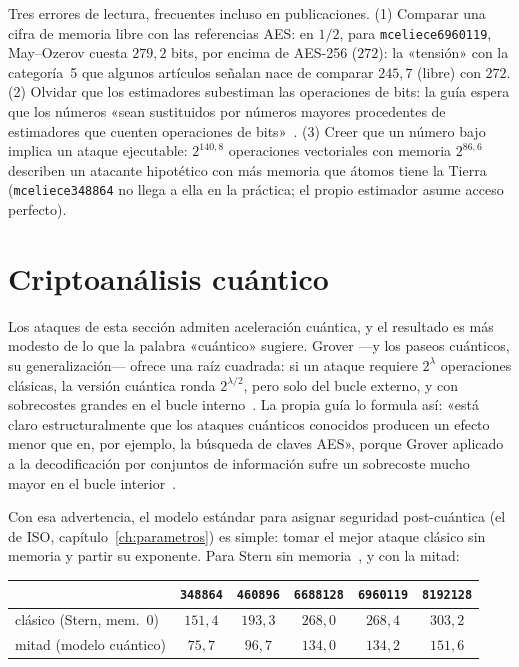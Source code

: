 \begin{trampa}
Tres errores de lectura, frecuentes incluso en publicaciones. (1)
Comparar una cifra de memoria libre con las referencias AES: en
$1/2$, para \texttt{mceliece6960119}, May--Ozerov cuesta $279{,}2$
bits, por encima de AES-256 ($272$): la «tensión» con la categoría~5
que algunos artículos señalan nace de comparar $245{,}7$ (libre) con
$272$. (2) Olvidar que los estimadores subestiman las operaciones de
bits: la guía espera que los números «sean sustituidos por números
mayores procedentes de estimadores que cuenten operaciones de
bits»~\cite{cmsecurity}. (3) Creer que un número bajo implica un
ataque ejecutable: $2^{140{,}8}$ operaciones vectoriales con memoria
$2^{86{,}6}$ describen un atacante hipotético con más memoria que
átomos tiene la Tierra (\texttt{mceliece348864} no llega a ella en
la práctica; el propio estimador asume acceso perfecto).
\end{trampa}

\section{Criptoanálisis cuántico}\label{sec:isd-cuantico}

Los ataques de esta sección admiten aceleración cuántica, y el
resultado es más modesto de lo que la palabra «cuántico» sugiere.
Grover ---y los paseos cuánticos, su generalización--- ofrece una
raíz cuadrada: si un ataque requiere $2^{\lambda}$ operaciones
clásicas, la versión cuántica ronda $2^{\lambda/2}$, pero solo del
bucle externo, y con sobrecostes grandes en el bucle
interno~\cite{grover1996,bernstein2010,kachigar2017,kirshanova2018}.
La propia guía lo formula así: «está claro estructuralmente que los
ataques cuánticos conocidos producen un efecto menor que en, por
ejemplo, la búsqueda de claves AES», porque Grover aplicado a la
decodificación por conjuntos de información sufre un sobrecoste
mucho mayor en el bucle interior~\cite{cmsecurity}.

Con esa advertencia, el modelo estándar para asignar seguridad
post-cuántica (el de ISO, capítulo~\ref{ch:parametros}) es simple:
tomar el mejor ataque clásico sin memoria y partir su exponente.
Para Stern sin memoria~\cite{cmsecurity}, y con la mitad:

\begin{center}
\small
\begin{tabular}{lccccc}
\toprule
& \texttt{348864} & \texttt{460896} & \texttt{6688128} & \texttt{6960119} & \texttt{8192128}\\
\midrule
clásico (Stern, mem.\ $0$) & $151{,}4$ & $193{,}3$ & $268{,}0$ & $268{,}4$ & $303{,}2$\\
mitad (modelo cuántico) & $75{,}7$ & $96{,}7$ & $134{,}0$ & $134{,}2$ & $151{,}6$\\
\bottomrule
\end{tabular}
\end{center}

